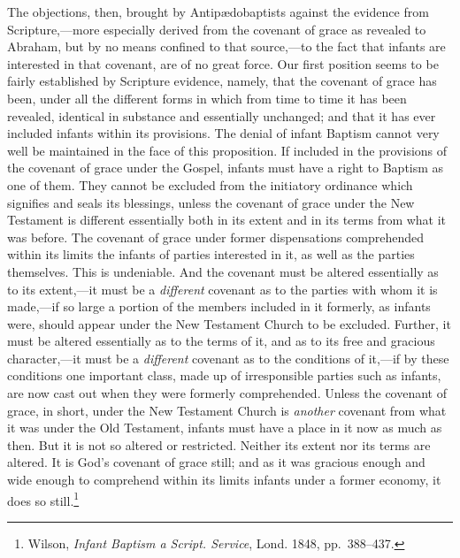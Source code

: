 \documentclass[
]{book}
\begin{document}
The objections, then, brought by Antipædobaptists against the evidence from Scripture,---more especially derived from the covenant of grace as revealed to Abraham, but by no means confined to that source,---to the fact that infants are interested in that covenant, are of no great force. Our first position seems to be fairly established by Scripture evidence, namely, that the covenant of grace has been, under all the different forms in which from time to time it has been revealed, identical in substance and essentially unchanged; and that it has ever included infants within its provisions. The denial of infant Baptism cannot very well be maintained in the face of this proposition. If included in the provisions of the covenant of grace under the Gospel, infants must have a right to Baptism as one of them. They cannot be excluded from the initiatory ordinance which signifies and seals its blessings, unless the covenant of grace under the New Testament is different essentially both in its extent and in its terms from what it was before. The covenant of grace under former dispensations comprehended within its limits the infants of parties interested in it, as well as the parties themselves. This is undeniable. And the covenant must be altered essentially as to its extent,---it must be a \emph{different} covenant as to the parties with whom it is made,---if so large a portion of the members included in it formerly, as infants were, should appear under the New Testament Church to be excluded. Further, it must be altered essentially as to the terms of it, and as to its free and gracious character,---it must be a \emph{different} covenant as to the conditions of it,---if by these conditions one important class, made up of irresponsible parties such as infants, are now cast out when they were formerly comprehended. Unless the covenant of grace, in short, under the New Testament Church is \emph{another} covenant from what it was under the Old Testament, infants must have a place in it now as much as then. But it is not so altered or restricted. Neither its extent nor its terms are altered. It is God's covenant of grace still; and as it was gracious enough and wide enough to comprehend within its limits infants under a former economy, it does so still.\footnote{Wilson, \emph{Infant Baptism a Script. Service}, Lond. 1848, pp.~388--437.}
\end{document}
